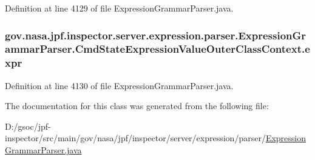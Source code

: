 Definition at line 4129 of file Expression\+Grammar\+Parser.\+java.

\subsubsection[{\texorpdfstring{expr}{expr}}]{ gov.\+nasa.\+jpf.\+inspector.\+server.\+expression.\+parser.\+Expression\+Grammar\+Parser.\+Cmd\+State\+Expression\+Value\+Outer\+Class\+Context.\+expr}\hypertarget{classgov_1_1nasa_1_1jpf_1_1inspector_1_1server_1_1expression_1_1parser_1_1_expression_grammar_paa97aac802c11881ff9166c765f4fc61a_a5dccb674202c015b6d0473cf09c8b0e5}{}\label{classgov_1_1nasa_1_1jpf_1_1inspector_1_1server_1_1expression_1_1parser_1_1_expression_grammar_paa97aac802c11881ff9166c765f4fc61a_a5dccb674202c015b6d0473cf09c8b0e5}


Definition at line 4130 of file Expression\+Grammar\+Parser.\+java.



The documentation for this class was generated from the following file\+:\begin{DoxyCompactItemize}
\item 
D\+:/gsoc/jpf-\/inspector/src/main/gov/nasa/jpf/inspector/server/expression/parser/\hyperlink{_expression_grammar_parser_8java}{Expression\+Grammar\+Parser.\+java}\end{DoxyCompactItemize}

